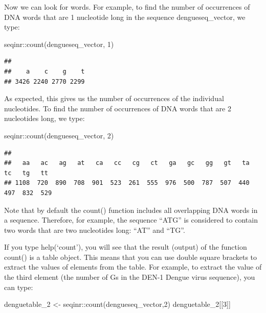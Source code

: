 \documentclass[
]{book}
\newenvironment{Shaded}{\begin{snugshade}}{\end{snugshade}}
\newcommand{\DecValTok}[1]{\textcolor[rgb]{0.00,0.00,0.81}{#1}}
\newcommand{\FunctionTok}[1]{\textcolor[rgb]{0.00,0.00,0.00}{#1}}
\newcommand{\NormalTok}[1]{#1}
\newcommand{\OtherTok}[1]{\textcolor[rgb]{0.56,0.35,0.01}{#1}}
\newcommand{\SpecialCharTok}[1]{\textcolor[rgb]{0.00,0.00,0.00}{#1}}
\begin{document}
Now we can look for words. For example, to find the number of occurrences of DNA words that are 1 nucleotide long in the sequence dengueseq\_vector, we type:

\begin{Shaded}
\begin{Highlighting}[]
\NormalTok{seqinr}\SpecialCharTok{::}\FunctionTok{count}\NormalTok{(dengueseq\_vector, }\DecValTok{1}\NormalTok{)}
\end{Highlighting}
\end{Shaded}

\begin{verbatim}
## 
##    a    c    g    t 
## 3426 2240 2770 2299
\end{verbatim}

As expected, this gives us the number of occurrences of the individual nucleotides. To find the number of occurrences of DNA words that are 2 nucleotides long, we type:

\begin{Shaded}
\begin{Highlighting}[]
\NormalTok{seqinr}\SpecialCharTok{::}\FunctionTok{count}\NormalTok{(dengueseq\_vector, }\DecValTok{2}\NormalTok{)}
\end{Highlighting}
\end{Shaded}

\begin{verbatim}
## 
##   aa   ac   ag   at   ca   cc   cg   ct   ga   gc   gg   gt   ta   tc   tg   tt 
## 1108  720  890  708  901  523  261  555  976  500  787  507  440  497  832  529
\end{verbatim}

Note that by default the count() function includes all overlapping DNA words in a sequence. Therefore, for example, the sequence ``ATG'' is considered to contain two words that are two nucleotides long: ``AT'' and ``TG''.

If you type help(`count'), you will see that the result (output) of the function count() is a table object. This means that you can use double square brackets to extract the values of elements from the table. For example, to extract the value of the third element (the number of Gs in the DEN-1 Dengue virus sequence), you can type:

\begin{Shaded}
\begin{Highlighting}[]
\NormalTok{denguetable\_2 }\OtherTok{\textless{}{-}}\NormalTok{ seqinr}\SpecialCharTok{::}\FunctionTok{count}\NormalTok{(dengueseq\_vector,}\DecValTok{2}\NormalTok{)}
\NormalTok{denguetable\_2[[}\DecValTok{3}\NormalTok{]]}
\end{Highlighting}
\end{Shaded}
\end{document}

